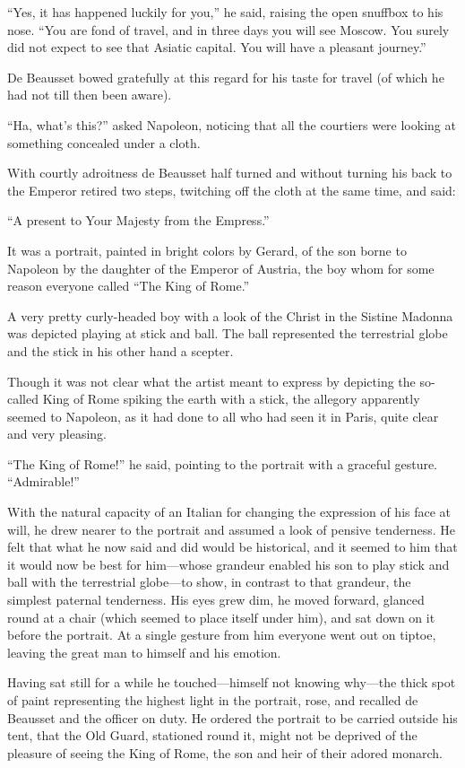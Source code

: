 ``Yes, it has happened luckily for you,'' he said, raising the
open snuffbox to his nose. ``You are fond of travel, and in three
days you will see Moscow. You surely did not expect to see that
Asiatic capital.  You will have a pleasant journey.''

De Beausset bowed gratefully at this regard for his taste for
travel (of which he had not till then been aware).

``Ha, what's this?'' asked Napoleon, noticing that all the
courtiers were looking at something concealed under a cloth.

With courtly adroitness de Beausset half turned and without
turning his back to the Emperor retired two steps, twitching off
the cloth at the same time, and said:

``A present to Your Majesty from the Empress.''

It was a portrait, painted in bright colors by Gerard, of the son
borne to Napoleon by the daughter of the Emperor of Austria, the
boy whom for some reason everyone called ``The King of Rome.''

A very pretty curly-headed boy with a look of the Christ in the
Sistine Madonna was depicted playing at stick and ball. The ball
represented the terrestrial globe and the stick in his other hand
a scepter.

Though it was not clear what the artist meant to express by
depicting the so-called King of Rome spiking the earth with a
stick, the allegory apparently seemed to Napoleon, as it had done
to all who had seen it in Paris, quite clear and very pleasing.

``The King of Rome!'' he said, pointing to the portrait with a
graceful gesture. ``Admirable!''

With the natural capacity of an Italian for changing the
expression of his face at will, he drew nearer to the portrait
and assumed a look of pensive tenderness. He felt that what he
now said and did would be historical, and it seemed to him that
it would now be best for him---whose grandeur enabled his son to
play stick and ball with the terrestrial globe---to show, in
contrast to that grandeur, the simplest paternal tenderness. His
eyes grew dim, he moved forward, glanced round at a chair (which
seemed to place itself under him), and sat down on it before the
portrait. At a single gesture from him everyone went out on
tiptoe, leaving the great man to himself and his emotion.

Having sat still for a while he touched---himself not knowing
why---the thick spot of paint representing the highest light in
the portrait, rose, and recalled de Beausset and the officer on
duty. He ordered the portrait to be carried outside his tent,
that the Old Guard, stationed round it, might not be deprived of
the pleasure of seeing the King of Rome, the son and heir of
their adored monarch.

